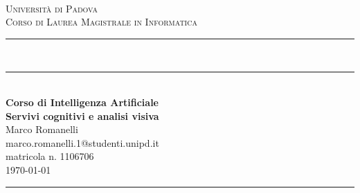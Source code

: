 \documentclass[fleqn,a4paper,11pt]{article}
\newcommand\HRule{\rule{\textwidth}{1pt}}
\newcommand\DRule{\rule{\textwidth}{.4pt}\\[\dimexpr-\baselineskip+1mm+2pt] \rule{\textwidth}{2pt}}
\begin{document}
\begin{titlepage}
\begin{center}
	\begin{minipage}{6in}
  		\centering
  		\hspace*{1.6in}
	\end{minipage}\\[1cm]
\textsc{\LARGE Universit\`a di Padova}\\[.2cm]
\textsc{\large Corso di Laurea Magistrale in Informatica}\\[.3cm]
\DRule \\[.5cm]
{\Large \bfseries Corso di Intelligenza Artificiale} \\[.4cm]
{\huge \bfseries Servivi cognitivi e analisi visiva} \\[.4cm]
{\Large Marco Romanelli} \\[.2cm]
{\footnotesize marco.romanelli.1@studenti.unipd.it} \\
{\footnotesize matricola n. 1106706} \\[1cm]
{\large \today}
\HRule \\[3cm]
\end{center}
\end{titlepage}
\newpage


\tableofcontents
\newpage















\clearpage
\appendix


\clearpage %




%
\end{document}
